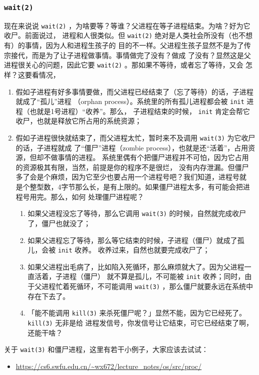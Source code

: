 \documentclass{wx672ctexart}
\begin{document}
\subsubsection{\texttt{wait(2)}}
\label{sec:org4961f8d}
现在来说说 \texttt{wait(2)} ，为啥要等？等谁？父进程在等子进程结束。为啥？好为它收尸。前面说过，
进程和人很类似。但 \texttt{wait(2)} 绝对是人类社会所没有（也不想有）的事情，因为人和进程生孩子的
目的不一样。父进程生孩子显然不是为了传宗接代，而是为了让子进程做事情。事情做完了没有？做成
了没有？显然这是父进程很关心的问题，因此它要 \texttt{wait(2)} 。那如果不等待，或者忘了等待，又会
怎样？这要看情况，
\begin{enumerate}
\item 假如子进程有好多事情要做，而父进程已经结束了（忘了等待）的话，子进程就成了“孤儿”进程
（orphan process）。系统里的所有孤儿进程都会被 \texttt{init} 进程（也就是1号进程）“收养”。那么，
子进程结束的时候， \texttt{init} 肯定会帮它收尸，也就是释放它所占用的系统资源；
\item 假如子进程很快就结束了，而父进程太忙，暂时来不及调用 \texttt{wait(3)} 为它收尸的话，子进程就成
了“僵尸”进程（zombie process），也就是还“活着”，占用资源，但却不做事情的进程。
系统里偶有个把僵尸进程并不可怕，因为它占用的资源极其有限，当然，前提是你的程序不是很烂，
没有内存泄漏。但僵尸多了会是个麻烦，因为它至少也要占用一个进程号吧？我们知道，进程号就
是个整型数，4字节那么长，是有上限的。如果僵尸进程太多，有可能会把进程号用完。那么，如何
处理僵尸进程呢？
\begin{enumerate}
\item 如果父进程没忘了等待，那么它调用 \texttt{wait(3)} 的时候，自然就完成收尸了，僵尸也就没了；
\item 如果父进程忘了等待，那么等它结束的时候，子进程（僵尸）就成了孤儿，会被 \texttt{init} 收养。
收养过来，自然也就要完成收尸了；
\item 如果父进程出毛病了，比如陷入死循环，那么麻烦就大了。因为父进程一直活着，子进程（僵尸）
就不算是孤儿，不可能被 \texttt{init} 收养；同时，由于父进程忙着死循环，不可能调用 \texttt{wait(3)}
，那么僵尸就要永远在系统中存在下去了。
\item 「能不能调用 \texttt{kill(3)} 来杀死僵尸呢？」显然不能，因为它已经死了。 \texttt{kill(3)} 无非是给
进程发信号，你发信号让它结束，可它已经结束了啊，还能干啥？
\end{enumerate}
\end{enumerate}

关于 \texttt{wait(3)} 和僵尸进程，这里有若干小例子，大家应该去试试：
\begin{itemize}
\item \url{https://cs6.swfu.edu.cn/\~wx672/lecture\_notes/os/src/proc/}
\end{itemize}
\end{document}
